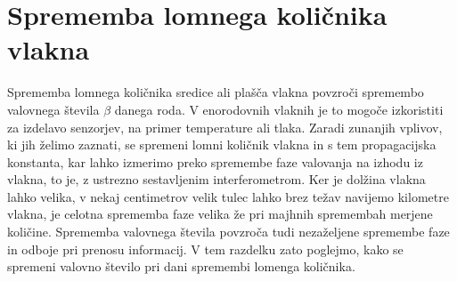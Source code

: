 \documentclass[11pt,fleqn]{book} %
\begin{document}
\section{Sprememba lomnega količnika vlakna}

Sprememba lomnega količnika sredice ali plašča vlakna povzroči spremembo
valovnega števila $\beta$ danega roda. V enorodovnih vlaknih je to
mogoče izkoristiti za izdelavo senzorjev, na primer temperature ali
tlaka. Zaradi zunanjih vplivov, ki jih želimo zaznati, se spremeni
lomni količnik vlakna in s tem propagacijska konstanta, kar lahko
izmerimo preko spremembe faze valovanja na izhodu iz vlakna, to je,
z ustrezno sestavljenim interferometrom. Ker je dolžina vlakna lahko
velika, v nekaj centimetrov velik tulec lahko brez težav navijemo
kilometre vlakna, je celotna sprememba faze velika že pri majhnih
spremembah merjene količine. Sprememba valovnega števila povzroča
tudi nezaželjene spremembe faze in odboje pri prenosu informacij.
V tem razdelku zato poglejmo, kako se spremeni valovno število pri
dani spremembi lomenga količnika.
\end{document}
